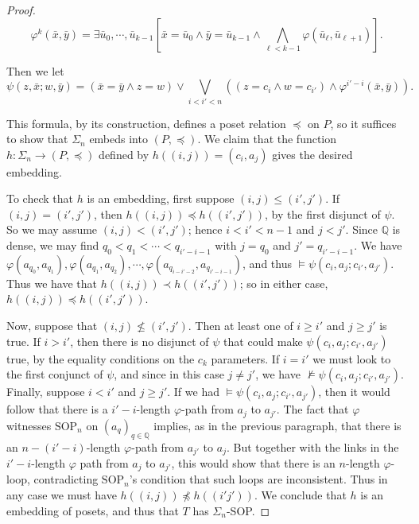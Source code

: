 \documentclass[10pt,a4paper]{amsart}
\newcommand{\bbQ}{\mathbb{Q}}
\newcommand{\SOP}{\text{SOP}}
\newcommand{\vphi}{\varphi}
\begin{document}
\begin{proof}
$$\vphi^k(\bar{x}, \bar{y})=\exists \bar{u}_0,\dotsm, \bar{u}_{k-1}\left[\bar{x}=\bar{u}_0\land \bar{y}=\bar{u}_{k-1}\land \bigwedge_{\ell<k-1}\vphi(\bar{u}_\ell, \bar{u}_{\ell+1})\right].$$

Then we let 
    \[\psi(z,\bar{x};w,\bar{y})=(\bar{x}=\bar{y}\land z=w)\lor\bigvee_{i<i'<n}\left((z=c_i
    \land w=c_{i'})\land \vphi^{i'-i}(\bar{x},\bar{y})\right).\]

    This formula, by its construction, defines a poset relation $\preceq$ on $P$, so it suffices to show that $\Sigma_n$ embeds into $(P,\preceq)$. We claim that the function $h\colon \Sigma_n\to (P,\preceq)$ defined by $h((i,j))=(c_i, a_j)$ gives the desired embedding.

    To check that $h$ is an embedding, first suppose $(i,j)\leq(i',j')$. If $(i,j)=(i',j')$, then $h((i,j))\preceq h((i',j'))$, by the first disjunct of $\psi$. So we may assume $(i,j)<(i',j')$; hence $i<i' <n-1$ and $j<j'$. Since $\bbQ$ is dense, we may find $q_0<q_1<\dotsm <q_{i'-i-1}$ with $j=q_0$ and $j'=q_{i'-i-1}$. We have $\vphi(a_{q_0}, a_{q_1}), \vphi(a_{q_1},a_{q_2}),\dotsm, \vphi(a_{q_{i-i'-2}},a_{q_{i'-i-1}})$, and thus $\models \psi(c_i,a_j;c_{i'},a_{j'})$. Thus we have that $h((i,j))\prec h((i',j'))$; so in either case, $h((i,j))\preceq h((i',j'))$.
    
    Now, suppose that $(i,j)\not\leq(i',j')$. Then at least one of $i\geq i'$ and $j\geq j'$ is true. If $i>i'$, then there is no disjunct of $\psi$ that could make $\psi(c_i,a_j;c_{i'},a_{j'})$ true, by the equality conditions on the $c_k$ parameters. If $i=i'$ we must look to the first conjunct of $\psi$, and since in this case $j\neq j'$, we have $\not\models \psi(c_i,a_j;c_{i'},a_{j'})$. Finally, suppose $i<i'$ and $j\geq j'$. If we had $\models \psi(c_i,a_j;c_{i'},a_{j'})$, then it would follow that there is a $i'-i$-length $\vphi$-path from $a_{j}$ to $a_{j'}$. The fact that $\vphi$ witnesses $\SOP_n$ on $(a_q)_{q\in\bbQ}$ implies, as in the previous paragraph, that there is an $n-(i'-i)$-length $\varphi$-path from $a_{j'}$ to $a_{j}$. But together with the links in the $i'-i$-length $\vphi$ path from $a_{j}$ to $a_{j'}$, this would show that there is an $n$-length $\vphi$-loop, contradicting $\SOP_n$'s condition that such loops are inconsistent. Thus in any case we must have $h((i,j))\not\preceq h((i'j'))$. We conclude that $h$ is an embedding of posets, and thus that $T$ has $\Sigma_n$-SOP.
    
\end{proof}
\end{document}
